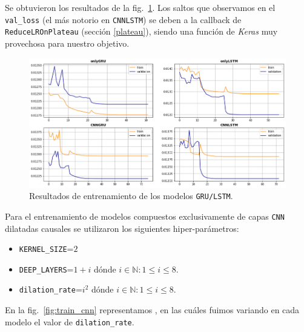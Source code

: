 \documentclass[a4paper,12pt]{article}
\begin{document}
Se obtuvieron los resultados de la fig.~\ref{fig:training_plot}. Los saltos que observamos en el \texttt{val\_loss} (el más notorio en \texttt{CNNLSTM}) se deben a la callback de \texttt{ReduceLROnPlateau} (sección \ref{plateau}), siendo una función de \textit{Keras} muy provechosa para nuestro objetivo.

\begin{figure}[H]
	\begin{center}
	\includegraphics[width=1\textwidth]{training_plots.png}
  	\caption{Resultados de entrenamiento de los modelos \texttt{GRU/LSTM}.}
  	\label{fig:training_plot}
  	\end{center}
\end{figure}

Para el entrenamiento de modelos compuestos exclusivamente de capas \texttt{CNN} dilatadas causales se utilizaron los siguientes hiper-parámetros:
\begin{itemize}
	\item \texttt{KERNEL\_SIZE}=$2$
	\item \texttt{DEEP\_LAYERS}=$1+i$ dónde $i \in \mathbb{N}: 1 \leq i \leq 8$.
	\item \texttt{dilation\_rate}=$i^2$ dónde $i \in \mathbb{N}: 1 \leq i \leq 8$.
\end{itemize}

En la fig.~\ref{fig:train_cnn} representamos , en las cuáles fuimos variando en cada modelo el valor de \texttt{dilation\_rate}.
\end{document}
